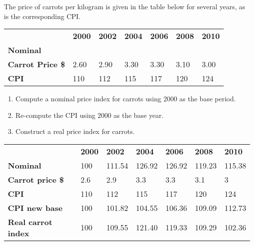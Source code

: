 \begin{enumialphparenastyle}
\begin{ex}\label{ex:ch2ex5}
The price of carrots per kilogram is given in the table below for several years, as is the corresponding CPI.
\begin{center}
\begin{tabu} to \linewidth {|X[2.5,c]X[1,c]X[1,c]X[1,c]X[1,c]X[1,c]X[1,c]|}	\hline
{}		&	\textbf{2000}	&	\textbf{2002}	&	\textbf{2004}	&	\textbf{2006}	&	\textbf{2008}	&	\textbf{2010}	\\
\textbf{Nominal}	&	&	&	&	&	&	\\
	\textbf{Carrot Price \$}	&	2.60	&	2.90	&	3.30	&	3.30	&	3.10	&	3.00	\\
\textbf{CPI}							&	110		&	112		&	115		&	117		&	120		&	124		\\	\hline
\end{tabu}
\end{center}
\begin{enumerate}
	\item	Compute a nominal price index for carrots using 2000 as the base period.
	\item	Re-compute the CPI using 2000 as the base year.
	\item	Construct a real price index for carrots.
\end{enumerate}
\begin{sol}
	\begin{center}
	\begin{tabu} to \linewidth {|X[2,c]X[1,c]X[1,c]X[1,c]X[1,c]X[1,c]X[1,c]|}	\hline
		 & \textbf{2000} & \textbf{2002} & \textbf{2004} & \textbf{2006} & \textbf{2008} & \textbf{2010} \\
		\textbf{Nominal} & 100 & 111.54 & 126.92 & 126.92 & 119.23 & 115.38 \\
		\textbf{Carrot price \$} & 2.6 & 2.9 & 3.3 & 3.3 & 3.1 & 3 \\
		\textbf{CPI} & 110 & 112 & 115 & 117 & 120 & 124 \\
		\textbf{CPI new base} & 100 & 101.82 & 104.55 & 106.36 & 109.09 & 112.73 \\
		\textbf{Real carrot index} & 100 & 109.55 & 121.40 & 119.33 & 109.29 & 102.36 \\ \hline
	\end{tabu}
	\end{center}
\end{sol}
\end{ex}


\end{enumialphparenastyle}
